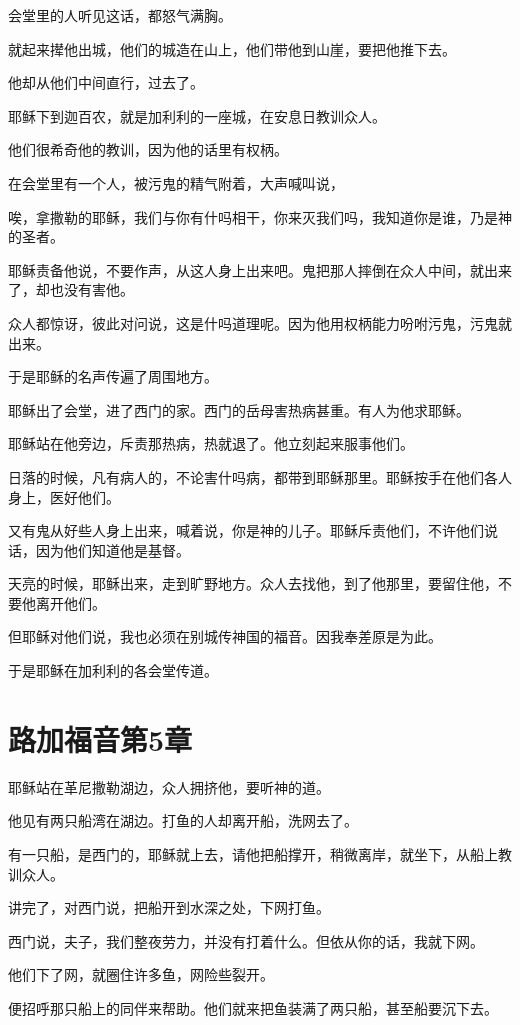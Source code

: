 \documentclass[12pt,oneside]{book}
\begin{document}
会堂里的人听见这话，都怒气满胸。

就起来撵他出城，他们的城造在山上，他们带他到山崖，要把他推下去。

他却从他们中间直行，过去了。

耶稣下到迦百农，就是加利利的一座城，在安息日教训众人。

他们很希奇他的教训，因为他的话里有权柄。

在会堂里有一个人，被污鬼的精气附着，大声喊叫说，

唉，拿撒勒的耶稣，我们与你有什吗相干，你来灭我们吗，我知道你是谁，乃是神的圣者。

耶稣责备他说，不要作声，从这人身上出来吧。鬼把那人摔倒在众人中间，就出来了，却也没有害他。

众人都惊讶，彼此对问说，这是什吗道理呢。因为他用权柄能力吩咐污鬼，污鬼就出来。

于是耶稣的名声传遍了周围地方。

耶稣出了会堂，进了西门的家。西门的岳母害热病甚重。有人为他求耶稣。

耶稣站在他旁边，斥责那热病，热就退了。他立刻起来服事他们。

日落的时候，凡有病人的，不论害什吗病，都带到耶稣那里。耶稣按手在他们各人身上，医好他们。

又有鬼从好些人身上出来，喊着说，你是神的儿子。耶稣斥责他们，不许他们说话，因为他们知道他是基督。

天亮的时候，耶稣出来，走到旷野地方。众人去找他，到了他那里，要留住他，不要他离开他们。

但耶稣对他们说，我也必须在别城传神国的福音。因我奉差原是为此。

于是耶稣在加利利的各会堂传道。

\chapter{路加福音第5章}
耶稣站在革尼撒勒湖边，众人拥挤他，要听神的道。

他见有两只船湾在湖边。打鱼的人却离开船，洗网去了。

有一只船，是西门的，耶稣就上去，请他把船撑开，稍微离岸，就坐下，从船上教训众人。

讲完了，对西门说，把船开到水深之处，下网打鱼。

西门说，夫子，我们整夜劳力，并没有打着什么。但依从你的话，我就下网。

他们下了网，就圈住许多鱼，网险些裂开。

便招呼那只船上的同伴来帮助。他们就来把鱼装满了两只船，甚至船要沉下去。
\end{document}

